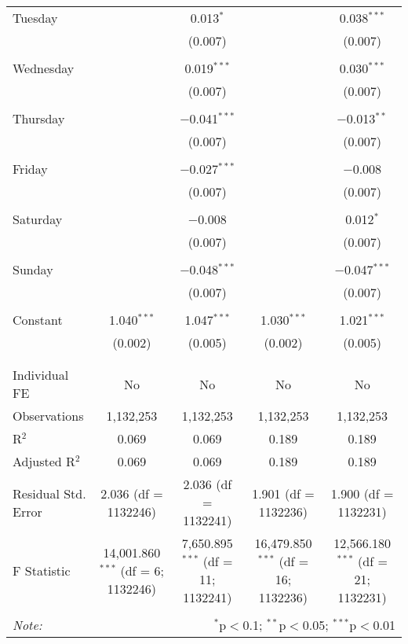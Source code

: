 \documentclass[
]{article}
\begin{document}
\begin{table}[!htbp]
{\begin{tabular}{@{\extracolsep{5pt}}lcccc}
 Tuesday &  & 0.013$^{*}$ &  & 0.038$^{***}$ \\ 
  &  & (0.007) &  & (0.007) \\ 
  & & & & \\ 
 Wednesday &  & 0.019$^{***}$ &  & 0.030$^{***}$ \\ 
  &  & (0.007) &  & (0.007) \\ 
  & & & & \\ 
 Thursday &  & $-$0.041$^{***}$ &  & $-$0.013$^{**}$ \\ 
  &  & (0.007) &  & (0.007) \\ 
  & & & & \\ 
 Friday &  & $-$0.027$^{***}$ &  & $-$0.008 \\ 
  &  & (0.007) &  & (0.007) \\ 
  & & & & \\ 
 Saturday &  & $-$0.008 &  & 0.012$^{*}$ \\ 
  &  & (0.007) &  & (0.007) \\ 
  & & & & \\ 
 Sunday &  & $-$0.048$^{***}$ &  & $-$0.047$^{***}$ \\ 
  &  & (0.007) &  & (0.007) \\ 
  & & & & \\ 
 Constant & 1.040$^{***}$ & 1.047$^{***}$ & 1.030$^{***}$ & 1.021$^{***}$ \\ 
  & (0.002) & (0.005) & (0.002) & (0.005) \\ 
  & & & & \\ 
\hline \\[-1.8ex] 
Individual FE & No & No & No & No \\ 
Observations & 1,132,253 & 1,132,253 & 1,132,253 & 1,132,253 \\ 
R$^{2}$ & 0.069 & 0.069 & 0.189 & 0.189 \\ 
Adjusted R$^{2}$ & 0.069 & 0.069 & 0.189 & 0.189 \\ 
Residual Std. Error & 2.036 (df = 1132246) & 2.036 (df = 1132241) & 1.901 (df = 1132236) & 1.900 (df = 1132231) \\ 
F Statistic & 14,001.860$^{***}$ (df = 6; 1132246) & 7,650.895$^{***}$ (df = 11; 1132241) & 16,479.850$^{***}$ (df = 16; 1132236) & 12,566.180$^{***}$ (df = 21; 1132231) \\ 
\hline 
\hline \\[-1.8ex] 
\textit{Note:}  & \multicolumn{4}{r}{$^{*}$p$<$0.1; $^{**}$p$<$0.05; $^{***}$p$<$0.01} \\ 
\end{tabular}
} 
\end{table} 
\newpage
\end{document}
